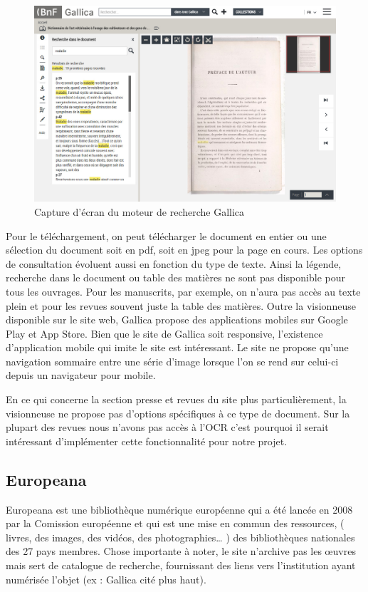         \begin{figure}[h!]
            \centering
            \includegraphics[width=1\textwidth]{figure/screenshot_gallica.jpg}
            \caption{Capture d'écran du moteur de recherche Gallica}
            \label{fig:gallica}
        \end{figure}

        Pour le téléchargement, on peut télécharger le document en entier ou une sélection du document soit en pdf,
        soit en jpeg pour la page en cours. Les options de consultation évoluent aussi en fonction du type de texte.
        Ainsi la légende, recherche dans le document ou table des matières ne sont pas disponible pour tous les ouvrages.
        Pour les manuscrits, par exemple, on n’aura pas accès au texte plein et pour les revues souvent juste la table des matières.
        Outre la visionneuse disponible sur le site web, Gallica propose des applications mobiles sur Google Play et App Store.
        Bien que le site de Gallica soit responsive, l'existence d’application mobile qui imite le site est intéressant.
        Le site ne propose qu’une navigation sommaire entre une série d’image lorsque l’on se rend sur celui-ci depuis un navigateur pour mobile.

        En ce qui concerne la section presse et revues du site plus particulièrement, la visionneuse ne propose
        pas d’options spécifiques à ce type de document. Sur la plupart des revues nous n’avons pas accès à l’OCR
        c’est pourquoi il serait intéressant d’implémenter cette fonctionnalité pour notre projet.

        \subsection{Europeana}
        \label{sec:europeana}
        Europeana est une bibliothèque numérique européenne qui a été lancée en 2008 par la Comission européenne et qui est une mise en commun des ressources,
        ( livres, des images, des vidéos, des photographies… ) des bibliothèques nationales des 27 pays membres. Chose importante à noter,
        le site n’archive pas les œuvres mais sert de catalogue de recherche, fournissant des liens vers l’institution ayant numérisée l’objet 
        (ex : Gallica cité plus haut).

